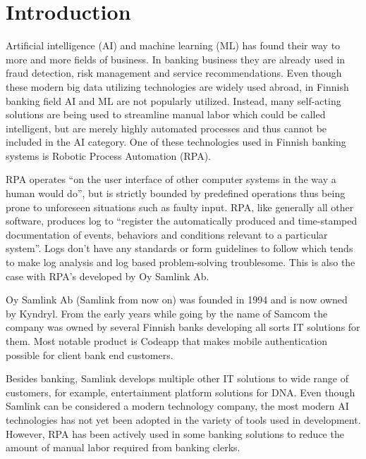 
\section{Introduction}\label{sec:introduction}

\thispagestyle{empty}
Artificial intelligence (AI) and machine learning (ML)
has found their way to
more and more fields of business.
In banking business they are already used in
fraud detection, risk management and service recommendations.\cite{donepudi2017machine}
Even though these
modern big data utilizing technologies
are widely used abroad,
in Finnish banking field AI and ML are not popularly utilized.
Instead,
many self-acting solutions are being used
to streamline manual labor
which could be called intelligent,
but are merely highly automated processes
and thus cannot be included in the AI category.
One of these technologies used in Finnish banking systems
is Robotic Process Automation (RPA).

RPA operates \enquote{on the user interface of other computer systems
in the way a human would do},\cite{van2018robotic}
but is strictly bounded by predefined operations
thus being prone to unforeseen situations
such as faulty input.
RPA, like generally all other software,
produces log to \enquote{register
the automatically produced and time-stamped documentation
of events, behaviors and conditions
relevant to a particular system}\cite{delarosa2018log}.
Logs don't have any standards or form guidelines to follow
which tends to make
log analysis and log based problem-solving troublesome.
This is also the case with RPA's developed by Oy Samlink Ab.

Oy Samlink Ab (Samlink from now on)
was founded in 1994
and is now owned by Kyndryl.
From the early years
while going by the name of Samcom
the company was owned by several Finnish banks
developing all sorts IT solutions for them.
Most notable product is Codeapp %
that makes mobile authentication possible
for client bank end customers.

Besides banking,
Samlink develops multiple other IT solutions
to wide range of customers,
for example,
entertainment platform solutions for DNA\@.
Even though Samlink can be considered
a modern technology company,
the most modern AI technologies has not yet been adopted
in the variety of tools used in development.
However,
RPA has been actively used
in some banking solutions
to reduce the amount of manual labor required
from banking clerks.

